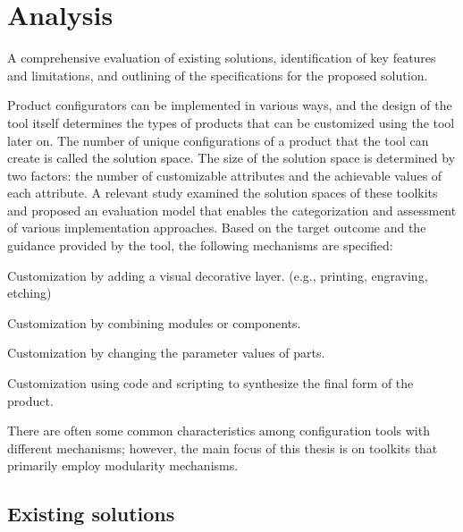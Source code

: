 \chapter{Analysis}

\begin{chapterabstract}
A comprehensive evaluation of existing solutions, identification of key features and limitations, and outlining of the specifications for the proposed solution.
\end{chapterabstract}

Product configurators can be implemented in various ways, and the design of the tool itself determines the types of products that can be customized using the tool later on. The number of unique configurations of a product that the tool can create is called the solution space. The size of the solution space is determined by two factors: the number of customizable attributes and the achievable values of each attribute. \cite{Huiwen2018} A relevant study examined the solution spaces of these toolkits and proposed an evaluation model that enables the categorization and assessment of various implementation approaches. Based on the target outcome and the guidance provided by the tool, the following mechanisms are specified: \cite{Hermans2012}

\begin{definition}[Veneer]
Customization by adding a visual decorative layer. (e.g., printing, engraving, etching)
\end{definition}
\begin{definition}[Modularity]
Customization by combining modules or components.
\end{definition}
\begin{definition}[Parametric]
Customization by changing the parameter values of parts.
\end{definition}
\begin{definition}[Generative]
Customization using code and scripting to synthesize the final form of the product.
\end{definition}

There are often some common characteristics among configuration tools with different mechanisms; however, the main focus of this thesis is on toolkits that primarily employ modularity mechanisms.


\section{Existing solutions}
